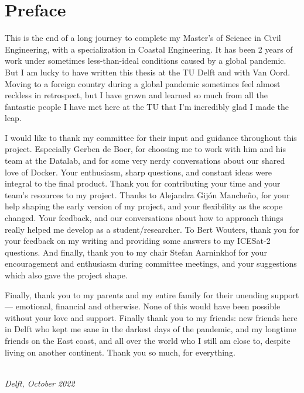 \chapter*{Preface}


This is the end of a long journey to complete my Master's of Science in Civil Engineering, with a specialization in Coastal Engineering. It has been 2 years of work under sometimes less-than-ideal conditions caused by a global pandemic. But I am lucky to have written this thesis at the TU Delft and with Van Oord. Moving to a foreign country during a global pandemic sometimes feel almost reckless in retrospect, but I have grown and learned so much from all the fantastic people I have met here at the TU that I'm incredibly glad I made the leap.  



I would like to thank my committee for their input and guidance throughout this project. Especially Gerben de Boer, for choosing me to work with him and his team at the Datalab, and for some very nerdy conversations about our shared love of Docker. Your enthusiasm, sharp questions, and constant ideas were integral to the final product. Thank you for contributing your time and your team's resources to my project. Thanks to Alejandra Gijón Mancheño, for your help shaping the early version of my project, and your flexibility as the scope changed. Your feedback, and our conversations about how to approach things really helped me develop as a student/researcher. To Bert Wouters, thank you for your feedback on my writing and providing some answers to my ICESat-2 questions. And finally, thank you to my chair Stefan Aarninkhof for your encouragement and enthusiasm during committee meetings, and your suggestions which also gave the project shape.



Finally, thank you to my parents and my entire family for their unending support --- emotional, financial and otherwise. None of this would have been possible without your love and support. Finally thank you to my friends: new friends here in Delft who kept me sane in the darkest days of the pandemic, and my longtime friends on the East coast, and all over the world who I still am close to, despite living on another continent. Thank you so much, for everything.

\begin{flushright}
{\makeatletter\itshape
    \@author \\
    Delft, October 2022
\makeatother}
\end{flushright}

